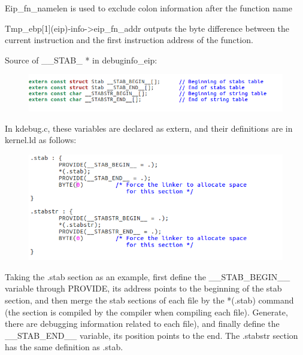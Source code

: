 Eip\_fn\_namelen is used to exclude colon information after the function name

Tmp\_ebp[1](eip)-info->eip\_fn\_addr outputs the byte difference between the current instruction and the first instruction address of the function.

Source of \_\_STAB\_ * in debuginfo\_eip:

\begin{figure}[H]
  \centering
  \includegraphics[width=0.8\linewidth]{figure/challenge_4}
\end{figure}


In kdebug.c, these variables are declared as extern, and their definitions are in kernel.ld as follows:

\begin{figure}[H]
  \centering
  \includegraphics[width=0.8\linewidth]{figure/challenge_5}
\end{figure}

Taking the .stab section as an example, first define the \_\_STAB\_BEGIN\_\_ variable through PROVIDE, its address points to the beginning of the stab section, and then merge the stab sections of each file by the *(.stab) command (the section is compiled by the compiler when compiling each file). Generate, there are debugging information related to each file), and finally define the \_\_STAB\_END\_\_ variable, its position points to the end. The .stabstr section has the same definition as .stab.
\clearpage





























